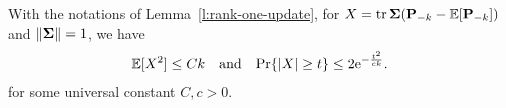 \documentclass{article}
\begin{document}

\begin{lemma}\label{l:trace}
With the notations of Lemma~\ref{l:rank-one-update}, for $X=\mathrm{tr}\,\mathbf{\Sigma}(\mathbf P_{-k}-\mathbb E[\mathbf P_{-k}])$
and $\|\mathbf{\Sigma}\| = 1$, we have
\begin{align*}
  \mathbb E[X^2]\leq
  Ck\quad\text{and}\quad\mathrm{Pr}\{|X|\geq t\}\leq 2 \mathrm{e}^{-\frac{t^2}{ck}}.
  \end{align*}
  for some universal constant $C,c > 0$.
\end{lemma}
\end{document}
